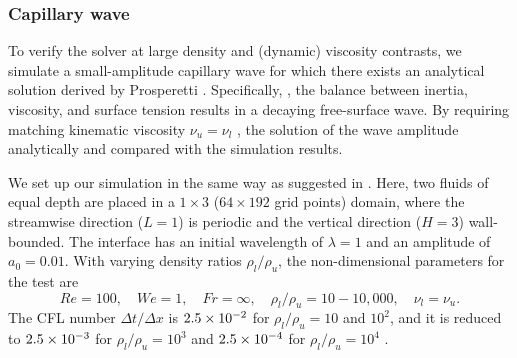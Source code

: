 



\subsubsection{Capillary wave}
\label{subsec: cap_wave}

To verify the solver at large density and (dynamic) viscosity contrasts, we simulate a small-amplitude capillary wave for which there exists an analytical solution derived by Prosperetti \cite{Prosperetti_1981}. Specifically, , the balance between inertia, viscosity, and surface tension results in a decaying free-surface wave. By requiring matching kinematic viscosity $\nu_u=\nu_l$ , the solution of the wave amplitude  analytically and compared with the simulation results. 

We set up our simulation in the same way as suggested in \cite{Dodd_JCP_2014}. Here, two fluids of equal depth are placed in a $1\times3$ ($64\times192$ grid points) domain, where the streamwise direction ($L=1$) is periodic and the vertical direction ($H=3$) wall-bounded. The interface has an initial wavelength of $\lambda=1$ and an amplitude of $a_0=0.01$. With varying density ratios $\rho_l/\rho_u$, the non-dimensional parameters for the test are
\begin{equation}
    Re=100, \quad We=1, \quad Fr=\infty, \quad \rho_l/\rho_u=10-10,000, \quad \nu_l=\nu_u.
  \label{capillary_wave_test}
\end{equation}
The CFL number $\Delta t/\Delta x$ is $2.5\times 10^{-2}$ for $\rho_l/\rho_u=10$ and $10^2$, and it is reduced to $2.5\times 10^{-3}$ for $\rho_l/\rho_u=10^3$ and $2.5\times 10^{-4}$ for $\rho_l/\rho_u=10^4$ .

